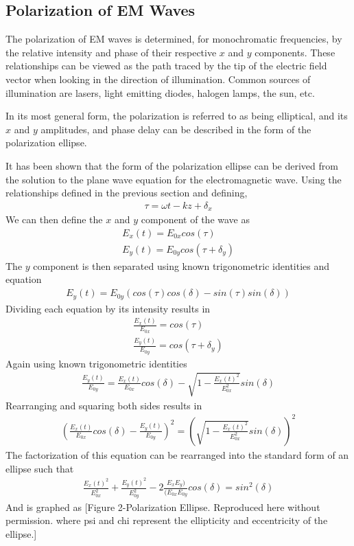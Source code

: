 \subsection{Polarization of EM Waves}
The polarization of EM waves is determined, for monochromatic frequencies, by the relative intensity and phase of their respective $x$ and $y$ components.  These relationships can be viewed as the path traced by the tip of the electric field vector when looking in the direction of illumination.  Common sources of illumination are lasers, light emitting diodes, halogen lamps, the sun, etc.

In its most general form, the polarization is referred to as being elliptical, and its $x$ and $y$ amplitudes, and phase delay can be described in the form of the polarization ellipse.

It has been shown that the form of the polarization ellipse can be derived from the solution to the plane wave equation for the electromagnetic wave.  Using the relationships defined in the previous section and defining,
%
\begin{align}
    \tau=\omega t-kz+\delta_x
\end{align}
%
We can then define the $x$ and $y$ component of the wave as
%
\begin{align}
	E_x (t)=E_{0x} cos(\tau)\\
	E_y (t)=E_{0y} cos(\tau+\delta_y )
\end{align}
%
The $y$ component is then separated using known trigonometric identities and equation
%
\begin{align}
E_y (t)=E_{0y} (cos(\tau) cos(\delta)-sin(\tau)sin(\delta))
\end{align}
%
Dividing each equation by its intensity results in
%
\begin{align}
    \frac{E_x (t)}{E_{0x}} =cos(\tau) \\
    \frac{E_y (t)}{E_{0y}} =cos(\tau+\delta_y )
\end{align}
%
Again using known trigonometric identities
%
\begin{align}
    \frac{E_y (t)}{E_{0y}} = \frac{E_x (t)}{E_{0x}}   cos(\delta)-\sqrt{1-\frac{E_x (t)^2}{E_{0x}^2} } sin(\delta)
\end{align}
%
Rearranging and squaring both sides results in
%
\begin{align}
    (\frac{E_x (t)}{E_{0x}}   cos(\delta)-\frac{E_y (t)}{E_{0y}} )^2=(\sqrt{1-\frac{E_x (t)^2}{E_{0x}^2} } sin(\delta))^2
\end{align}
%
The factorization of this equation can be rearranged into the standard form of an ellipse such that
%
\begin{align}
    \frac{E_x (t)^2}{E_{0x}^2} +\frac{E_y (t)^2}{E_{0y}^2} -2 \frac{E_x E_y)}{(E_{0x} E_{0y} } cos(\delta)=sin^2 (\delta)
\end{align}
%
And is graphed as
[Figure 2-Polarization Ellipse. Reproduced here without permission.
where psi and chi represent the ellipticity and eccentricity of the ellipse.]


